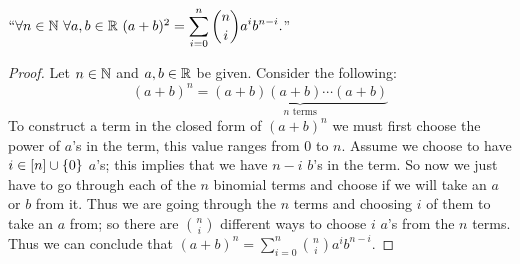         \begin{theorem}
            $``\forall n \in \mathbb{N} \ \forall a, b \in \mathbb{R} \ (a + b)^2 = \displaystyle\sum_{i = 0}^{n} \binom{n}{i}a^ib^{n - i}.$''
            \label{Binomial Theorem}
        \end{theorem}
        \begin{proof}
            Let $n \in \mathbb{N}$ and $a, b \in \mathbb{R}$ be given. Consider the following:
            \[
                (a + b)^n = \underbrace{(a + b)(a + b) \cdots (a + b)}_{\mbox{$n$ terms}}
            \]
            To construct a term in the closed form of $(a + b)^n$ we must first choose the power
            of $a$'s in the term, this value ranges from 0 to $n$. Assume we choose to have 
            $i \in [n] \cup \left\{0\right\}$ $a$'s; this
            implies that we have $n - i$ $b$'s in the term. So now we just have to go through each
            of the $n$ binomial terms and choose if we will take an $a$ or $b$ from it. Thus we
            are going through the $n$ terms and choosing $i$ of them to take an $a$ from; so there
            are $\binom{n}{i}$ different ways to choose $i$ $a$'s from the $n$ terms. Thus we can
            conclude that $(a + b)^n = \sum_{i = 0}^{n} \binom{n}{i} a^ib^{n - i}$. \QED
        \end{proof}
